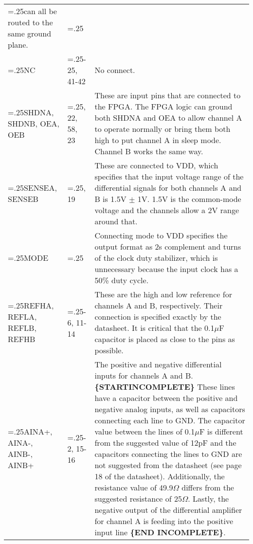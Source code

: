 \documentclass{default}
\begin{document}
\begin{tabularx}{\textwidth}{>{\hsize=.25\hsize} X >{\hsize=.25\hsize} XX}
                                   can all be routed to the same ground plane. \\
  NC & 24-25, 41-42 & No connect. \\
  SHDNA, SHDNB, OEA, OEB & 59, 22, 58, 23 & These are input pins that are connected to the FPGA. The
                                            FPGA logic can ground both SHDNA and OEA to allow
                                            channel A to operate normally or bring them both high to
                                            put channel A in sleep mode. Channel B works the same
                                            way. \\
  SENSEA, SENSEB & 62, 19 & These are connected to VDD, which specifies that the input voltage range
                            of the differential signals for both channels A and B is 1.5V $\pm$
                            1V. 1.5V is the common-mode voltage and the channels allow a 2V range
                            around that. \\
  MODE & 60 & Connecting mode to VDD specifies the output format as 2s complement and turns of the
              clock duty stabilizer, which is unnecessary because the input clock has a 50\% duty
              cycle. \\
  REFHA, REFLA, REFLB, REFHB & 3-6, 11-14 & These are the high and low reference for channels A and
                                            B, respectively. Their connection is specified exactly
                                            by the datasheet. It is critical that the 0.1$\mu$F
                                            capacitor is placed as close to the pins as possible. \\
  AINA+, AINA-, AINB-, AINB+ & 1-2, 15-16 & The positive and negative differential inputs for
                                            channels A and B. \textbf{\{STARTINCOMPLETE\}} These
                                            lines have a capacitor between the positive and negative
                                            analog inputs, as well as capacitors connecting each
                                            line to GND. The capacitor value between the lines of
                                            0.1$\mu$F is different from the suggested value of 12pF
                                            and the capacitors connecting the lines to GND are not
                                            suggested from the datasheet (see page 18 of the
                                            datasheet). Additionally, the resistance value of
                                            49.9$\Omega$ differs from the suggested resistance of
                                            25$\Omega$. Lastly, the negative output of the
                                            differential amplifier for channel A is feeding into the
                                            positive input line \textbf{\{END INCOMPLETE\}}. \\

  \bottomrule
\end{tabularx}
\end{document}
